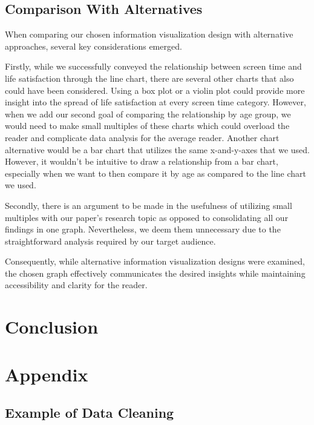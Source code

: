 \documentclass[12pt, a4paper]{article}
\begin{document}
\subsection{Comparison With Alternatives}
\par When comparing our chosen information visualization design with alternative approaches, several key considerations emerged.
\par Firstly, while we successfully conveyed the relationship between screen time and life satisfaction through the line chart, there are several other charts that also could have been considered. Using a box plot or a violin plot could provide more insight into the spread of life satisfaction at every screen time category. However, when we add our second goal of comparing the relationship by age group, we would need to make small multiples of these charts which could overload the reader and complicate data analysis for the average reader. Another chart alternative would be a bar chart that utilizes the same x-and-y-axes that we used. However, it wouldn’t be intuitive to draw a relationship from a bar chart, especially when we want to then compare it by age as compared to the line chart we used.
\par Secondly, there is an argument to be made in the usefulness of utilizing small multiples with our paper’s research topic as opposed to consolidating all our findings in one graph. Nevertheless, we deem them unnecessary due to the straightforward analysis required by our target audience.
\par Consequently, while alternative information visualization designs were examined, the chosen graph effectively communicates the desired insights while maintaining accessibility and clarity for the reader.


\section{Conclusion}

\newpage
\section*{Appendix}
\subsection*{Example of Data Cleaning}
\end{document}
